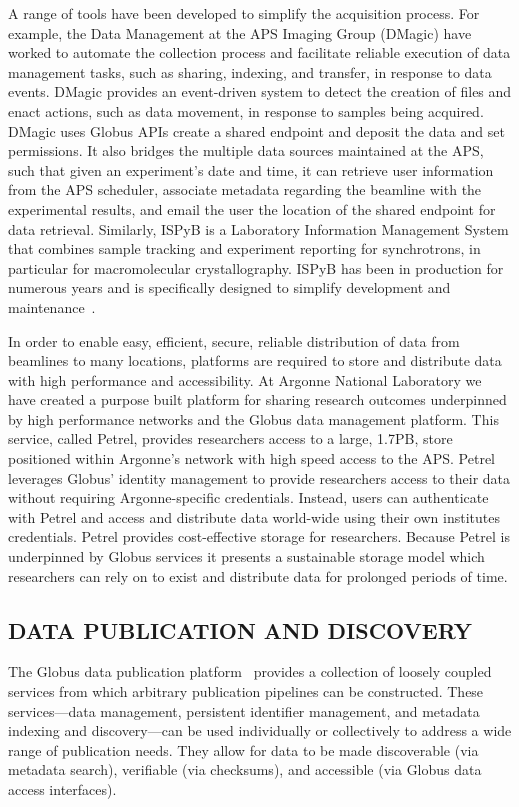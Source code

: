 \documentclass{aip-cp}
\begin{document}
A range of tools have been developed to simplify the acquisition process. For example, the Data 
Management at the APS Imaging Group (DMagic) have worked to automate the collection process and 
facilitate reliable execution of data management tasks, such as sharing, indexing, and transfer, in 
response to data events. DMagic provides an event-driven system to detect the creation of files and 
enact actions, such as data movement, in response to samples being acquired. DMagic uses Globus 
APIs create a shared endpoint and deposit the data and set permissions. It also bridges the 
multiple data sources maintained at the APS, such that given an experiment's date and time, it can 
retrieve user information from the APS scheduler, associate metadata regarding the beamline with 
the experimental results, and email the user the location of the shared endpoint for data 
retrieval. Similarly, ISPyB is a 
Laboratory Information Management System that combines sample tracking and experiment 
reporting for synchrotrons, in particular for macromolecular crystallography. ISPyB has been in 
production for numerous years and is specifically designed to simplify development and 
maintenance~\cite{delageniere2011ispyb}.

In order to enable easy, efficient, secure, reliable distribution of data from beamlines to many 
locations, platforms are required to store and distribute data with high performance and 
accessibility. At Argonne National Laboratory we have created a purpose built platform for sharing 
research outcomes underpinned by high performance networks and the Globus data management platform. 
This service, called Petrel, provides researchers access to a large, 1.7PB, store positioned within 
Argonne's network with high speed access to the APS. Petrel leverages Globus' identity management 
to provide researchers access to their data without requiring Argonne-specific credentials. 
Instead, users can authenticate with Petrel and access and distribute data world-wide using their 
own institutes credentials. Petrel provides cost-effective storage for researchers. Because Petrel 
is underpinned by Globus services it presents a sustainable storage model which researchers can 
rely on to exist and distribute data for prolonged periods of time.


\subsection{DATA PUBLICATION AND DISCOVERY}

The Globus data publication platform~\cite{ananthakrishnan2018publication} provides a
collection of loosely coupled services from which arbitrary publication
pipelines can be constructed.  These services---data management, persistent
identifier management, and  metadata indexing and discovery---can be used
individually or collectively to address a wide range of publication needs.
They allow for data to be made discoverable (via metadata search), verifiable
(via checksums), and accessible (via Globus data access interfaces).
\end{document}
